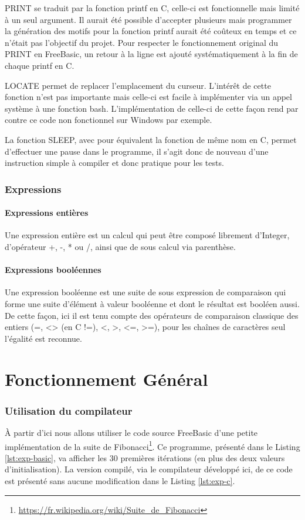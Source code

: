 \documentclass[french]{article}
\begin{document}
PRINT se traduit par la fonction printf en C, celle-ci est fonctionnelle mais limité à un seul argument. Il aurait été possible d'accepter plusieurs mais programmer la génération des motifs pour la fonction printf aurait été coûteux en temps et ce n'était pas l'objectif du projet. Pour respecter le fonctionnement original du PRINT en FreeBasic, un retour à la ligne est ajouté systématiquement à la fin de chaque printf en C.

LOCATE permet de replacer l'emplacement du curseur. L'intérêt de cette fonction n'est pas importante mais celle-ci est facile à implémenter via un appel système à une fonction bash. L'implémentation de celle-ci de cette façon rend par contre ce code non fonctionnel sur Windows par exemple.

La fonction SLEEP, avec pour équivalent la fonction de même nom en C, permet d'effectuer une pause dans le programme, il s'agit donc de nouveau d'une instruction simple à compiler et donc pratique pour les tests.

\section{Expressions}
\subsection{Expressions entières}
\label{ssec:expr-entiere}
Une expression entière est un calcul qui peut être composé librement d'Integer, d'opérateur +, -, * ou /, ainsi que de sous calcul via parenthèse.

\subsection{Expressions booléennes}
\label{ssec:expr-booleenne}

Une expression booléenne est une suite de sous expression de comparaison qui forme une suite d'élément à valeur booléenne et dont le résultat est booléen aussi. De cette façon, ici il est tenu compte des opérateurs de comparaison classique des entiers (=, <> (en C !=), <, >, <=, >=), pour les chaînes de caractères seul l'égalité est reconnue.

\part{Fonctionnement Général}
\section{Utilisation du compilateur}
À partir d'ici nous allons utiliser le code source FreeBasic d'une petite implémentation de la suite de Fibonacci\footnote{\url{https://fr.wikipedia.org/wiki/Suite_de_Fibonacci}}. Ce programme, présenté dans le Listing \ref{lst:exp-basic}, va afficher les 30 premières itérations (en plus des deux valeurs d'initialisation). La version compilé, via le compilateur développé ici, de ce code est présenté  sans aucune modification dans le Listing \ref{lst:exp-c}.
\end{document}
